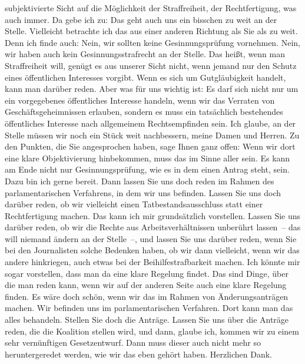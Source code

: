 \documentclass{article}
\begin{document}
subjektivierte Sicht auf die Möglichkeit der Straffreiheit, der Rechtfertigung, was auch immer. Da gebe ich zu: Das geht auch uns ein bisschen zu weit an der Stelle.  Vielleicht betrachte ich das aus einer anderen Richtung als Sie als zu weit. Denn ich finde auch: Nein, wir sollten keine Gesinnungsprüfung vornehmen. Nein, wir haben auch kein Gesinnungsstrafrecht an der Stelle. Das heißt, wenn man Straffreiheit will, genügt es aus unserer Sicht nicht, wenn jemand nur den Schutz eines öffentlichen Interesses vorgibt. Wenn es sich um Gutgläubigkeit handelt, kann man darüber reden. Aber was für uns wichtig ist: Es darf sich nicht nur um ein vorgegebenes öffentliches Interesse handeln, wenn wir das Verraten von Geschäftsgeheimnissen erlauben, sondern es muss ein tatsächlich bestehendes öffentliches Interesse nach allgemeinem Rechtsempfinden sein. Ich glaube, an der Stelle müssen wir noch ein Stück weit nachbessern, meine Damen und Herren. Zu den Punkten, die Sie angesprochen haben, sage Ihnen ganz offen: Wenn wir dort eine klare Objektivierung hinbekommen, muss das im Sinne aller sein. Es kann am Ende nicht nur Gesinnungsprüfung, wie es in dem einen Antrag steht, sein. Dazu bin ich gerne bereit. Dann lassen Sie uns doch reden im Rahmen des parlamentarischen Verfahrens, in dem wir uns befinden. Lassen Sie uns doch darüber reden, ob wir vielleicht einen Tatbestandsausschluss statt einer Rechtfertigung machen. Das kann ich mir grundsätzlich vorstellen.  Lassen Sie uns darüber reden, ob wir die Rechte aus Arbeitsverhältnissen unberührt lassen – das will niemand ändern an der Stelle –, und lassen Sie uns darüber reden, wenn Sie bei den Journalisten solche Bedenken haben, ob wir dann vielleicht, wenn wir das andere hinkriegen, auch etwas bei der Beihilfestrafbarkeit machen. Ich könnte mir sogar vorstellen, dass man da eine klare Regelung findet. Das sind Dinge, über die man reden kann, wenn wir auf der anderen Seite auch eine klare Regelung finden.  Es wäre doch schön, wenn wir das im Rahmen von Änderungsanträgen machen. Wir befinden uns im parlamentarischen Verfahren. Dort kann man das alles behandeln. Stellen Sie doch die Anträge.  Lassen Sie uns über die Anträge reden, die die Koalition stellen wird, und dann, glaube ich, kommen wir zu einem sehr vernünftigen Gesetzentwurf. Dann muss dieser auch nicht mehr so heruntergeredet werden, wie wir das eben gehört haben. Herzlichen Dank.  
\end{document}

